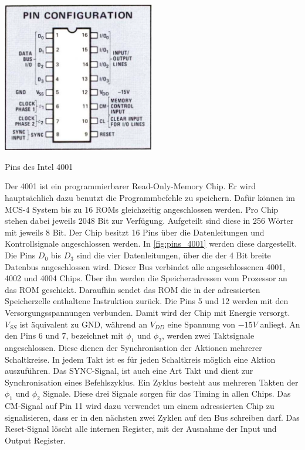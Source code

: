  \begin{floatingfigure}[r]{.5\textwidth}
 	\vspace{-10pt}
 	\includegraphics[width=0.5\textwidth]{figures/pins_4001.png}
 	\caption{Pins des Intel 4001}
 	\label{fig:pins_4001}
 \end{floatingfigure}
 Der 4001 ist ein programmierbarer Read-Only-Memory Chip. Er wird hauptsächlich dazu benutzt die Programmbefehle zu speichern. Dafür können im MCS-4 System bis zu 16 ROMs gleichzeitig angeschlossen werden. Pro Chip stehen dabei jeweils 2048 Bit zur Verfügung. Aufgeteilt sind diese in 256 Wörter mit jeweils 8 Bit. Der Chip besitzt 16 Pins über die Datenleitungen und Kontrollsignale angeschlossen werden. In \ref{fig:pins_4001} werden diese dargestellt. Die Pins $D_0$ bis $D_3$ sind die vier Datenleitungen, über die der 4 Bit breite Datenbus angeschlossen wird. Dieser Bus verbindet alle angeschlossenen 4001, 4002 und 4004 Chips. Über ihn werden die Speicheradressen vom Prozessor an das ROM geschickt. Daraufhin sendet das ROM die in der adressierten Speicherzelle enthaltene Instruktion zurück. Die Pins 5 und 12 werden mit den Versorgungsspannungen verbunden. Damit wird der Chip mit Energie versorgt. $V_{SS}$ ist äquivalent zu GND, während an $V_{DD}$ eine Spannung von $-15V$ anliegt.
 An den Pins 6 und 7, bezeichnet mit $\phi_1$ und $\phi_2$, werden zwei Taktsignale angeschlossen. Diese dienen der Synchronisation der Aktionen mehrerer Schaltkreise. In jedem Takt ist es für jeden Schaltkreis möglich eine Aktion auszuführen. Das SYNC-Signal, ist auch eine Art Takt und dient zur Synchronisation eines Befehlszyklus. Ein Zyklus besteht aus mehreren Takten der $\phi_1$ und $\phi_2$ Signale. Diese drei Signale sorgen für das Timing in allen Chips. Das CM-Signal auf Pin 11 wird dazu verwendet um einem adressierten Chip zu signalisieren, dass er in den nächsten zwei Zyklen auf den Bus schreiben darf. Das Reset-Signal löscht alle internen Register, mit der Ausnahme der Input und Output Register.
